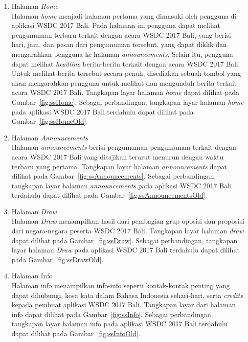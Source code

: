 \begin{enumerate}
	\item Halaman \textit{Home} \\
		Halaman \textit{home} menjadi halaman pertama yang dimasuki oleh pengguna di aplikasi WSDC 2017 Bali. Pada halaman ini pengguna dapat melihat pengumuman terbaru terkait dengan acara WSDC 2017 Bali, yang berisi hari, jam, dan pesan dari pengumuman tersebut, yang dapat diklik dan mengarahkan pengguna ke halaman \textit{announcements}. Selain itu, pengguna dapat melihat \textit{headline} berita-berita terkait dengan acara WSDC 2017 Bali. Untuk melihat berita tersebut secara penuh, disediakan sebuah tombol yang akan mengarahkan pengguna untuk melihat dan mengunduh berita terkait acara WSDC 2017 Bali. Tangkapan layar halaman \textit{home} dapat dilihat pada Gambar~\ref{fig:ssHome}. Sebagai perbandingan, tangkapan layar halaman \textit{home} pada aplikasi WSDC 2017 Bali terdahulu dapat dilihat pada Gambar~\ref{fig:ssHomeOld}.
		
\newpage		
		
	\item Halaman \textit{Announcements} \\
		Halaman \textit{announcements} berisi pengumuman-pengumuman terkait dengan acara WSDC 2017 Bali yang disajikan terurut menurun dengan waktu terbaru yang pertama. Tangkapan layar halaman \textit{announcements} dapat dilihat pada Gambar~\ref{fig:ssAnnouncements}. Sebagai perbandingan, tangkapan layar halaman \textit{announcements} pada aplikasi WSDC 2017 Bali terdahulu dapat dilihat pada Gambar~\ref{fig:ssAnnouncementsOld}.
	
	\item Halaman \textit{Draw} \\
		Halaman \textit{Draw} menampilkan hasil dari pembagian grup oposisi dan proposisi dari negara-negara peserta WSDC 2017 Bali. Tangkapan layar halaman \textit{draw} dapat dilihat pada Gambar~\ref{fig:ssDraw}. Sebagai perbandingan, tangkapan layar halaman \textit{Draw} pada aplikasi WSDC 2017 Bali terdahulu dapat dilihat pada Gambar~\ref{fig:ssDrawOld}.
		
	\item Halaman Info \\
		Halaman info menampilkan info-info seperti kontak-kontak penting yang dapat dihubungi, kosa kata dalam Bahasa Indonesia sehari-hari, serta {\it credits} kepada pembuat aplikasi WSDC 2017 Bali. Tangkapan layar dari halaman info dapat dilihat pada Gambar~\ref{fig:ssInfo}. Sebagai perbandingan, tangkapan layar halaman info pada aplikasi WSDC 2017 Bali terdahulu dapat dilihat pada Gambar~\ref{fig:ssInfoOld}.
		

\end{enumerate}
